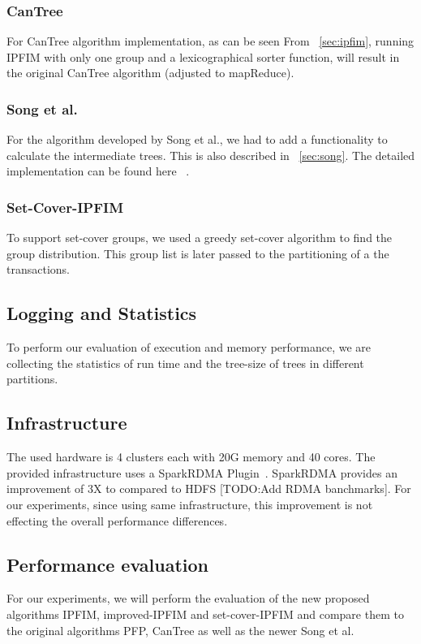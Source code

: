 \subsubsection{CanTree}
For CanTree algorithm implementation, as can be seen From ~\ref{sec:ipfim}, running IPFIM with only one group and a lexicographical sorter function, will result in the original CanTree algorithm (adjusted to mapReduce).

\subsubsection{Song et al.}
For the algorithm developed by Song et al., we had to add a functionality to calculate the intermediate trees. This is also described in ~\ref{sec:song}. The detailed implementation can be found here ~\cite{songLevImplementation}.

\subsubsection{Set-Cover-IPFIM}
To support set-cover groups, we used a greedy set-cover algorithm to find the group distribution. This group list is later passed to the partitioning of a the transactions. 

\subsection{Logging and Statistics}
To perform our evaluation of execution and memory performance, we are collecting the statistics of run time and the tree-size of trees in different partitions.

\subsection{Infrastructure}
The used hardware is 4 clusters each with 20G memory and 40 cores. The provided infrastructure uses a SparkRDMA Plugin~\cite{SparkRDMA}. SparkRDMA provides an improvement of 3X to compared to HDFS [TODO:Add RDMA banchmarks]. For our experiments, since using same infrastructure, this improvement is not effecting the overall performance differences. 

\iffalse
This is however in our experiments, using the datasets as different files, while all experiments using same infrastructure, the comparison is valid.  Elaborate in a new section?
\fi

\subsection{Performance evaluation}
For our experiments, we will perform the evaluation of the new proposed algorithms IPFIM, improved-IPFIM and set-cover-IPFIM and compare them to the original algorithms PFP, CanTree as well as the newer Song et al.

